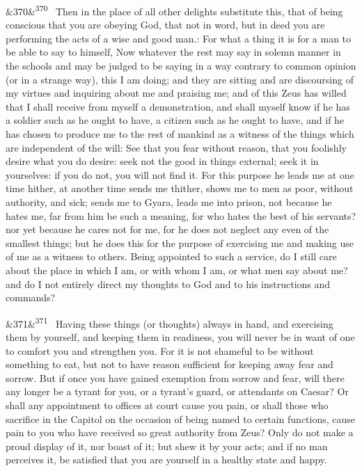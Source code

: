 \documentclass[12pt]{article}
\newcommand{\para}[1][]{\par\noindent\ifx&#1&\else\textsuperscript{\footnotesize #1}~\fi}
\begin{document}
\para[370] Then in the place of all other delights substitute this, that of being conscious that you are obeying God, that not in word, but in deed you are performing the acts of a wise and good man.: For what a thing it is for a man to be able to say to himself, Now whatever the rest may say in solemn manner in the schools and may be judged to be saying in a way contrary to common opinion (or in a strange way), this I am doing; and they are sitting and are discoursing of my virtues and inquiring about me and praising me; and of this Zeus has willed that I shall receive from myself a demonstration, and shall myself know if he has a soldier such as he ought to have, a citizen such as he ought to have, and if he has chosen to produce me to the rest of mankind as a witness of the things which are independent of the will: See that you fear without reason, that you foolishly desire what you do desire: seek not the good in things external; seek it in yourselves: if you do not, you will not find it. For this purpose he leads me at one time hither, at another time sends me thither, shows me to men as poor, without authority, and sick; sends me to Gyara, leads me into prison, not because he hates me, far from him be such a meaning, for who hates the best of his servants? nor yet because he cares not for me, for he does not neglect any even of the smallest things; but he does this for the purpose of exercising me and making use of me as a witness to others. Being appointed to such a service, do I still care about the place in which I am, or with whom I am, or what men say about me? and do I not entirely direct my thoughts to God and to his instructions and commands?

\para[371] Having these things (or thoughts) always in hand, and exercising them by yourself, and keeping them in readiness, you will never be in want of one to comfort you and strengthen you. For it is not shameful to be without something to eat, but not to have reason sufficient for keeping away fear and sorrow. But if once you have gained exemption from sorrow and fear, will there any longer be a tyrant for you, or a tyrant's guard, or attendants on Caesar? Or shall any appointment to offices at court cause you pain, or shall those who sacrifice in the Capitol on the occasion of being named to certain functions, cause pain to you who have received so great authority from Zeus? Only do not make a proud display of it, nor boast of it; but shew it by your acts; and if no man perceives it, be satisfied that you are yourself in a healthy state and happy.
\end{document}
